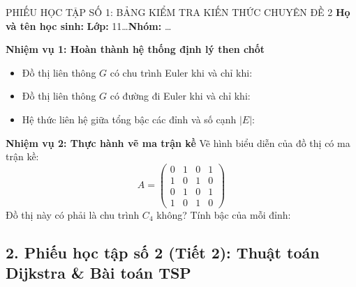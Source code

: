 \documentclass[12pt, a4paper]{article}
\begin{document}
\begin{pedabox}{PHIẾU HỌC TẬP SỐ 1: BẢNG KIỂM TRA KIẾN THỨC CHUYÊN ĐỀ 2}
    \textbf{Họ và tên học sinh:} \dotfill \textbf{Lớp:} 11\dots \textbf{Nhóm:} \dots
    
    \textbf{Nhiệm vụ 1: Hoàn thành hệ thống định lý then chốt}
    \begin{itemize}[leftmargin=0.6cm]
        \item Đồ thị liên thông $G$ có chu trình Euler khi và chỉ khi: \dotfill
        \item Đồ thị liên thông $G$ có đường đi Euler khi và chỉ khi: \dotfill
        \item Hệ thức liên hệ giữa tổng bậc các đỉnh và số cạnh $|E|$: \dotfill
    \end{itemize}

    \textbf{Nhiệm vụ 2: Thực hành vẽ ma trận kề}
    Vẽ hình biểu diễn của đồ thị có ma trận kề:
    $$A = \begin{pmatrix}
    0 & 1 & 0 & 1 \\
    1 & 0 & 1 & 0 \\
    0 & 1 & 0 & 1 \\
    1 & 0 & 1 & 0
    \end{pmatrix}$$
    Đồ thị này có phải là chu trình $C_4$ không? Tính bậc của mỗi đỉnh: \dotfill
\end{pedabox}

\subsection*{2. Phiếu học tập số 2 (Tiết 2): Thuật toán Dijkstra \& Bài toán TSP}
\end{document}

